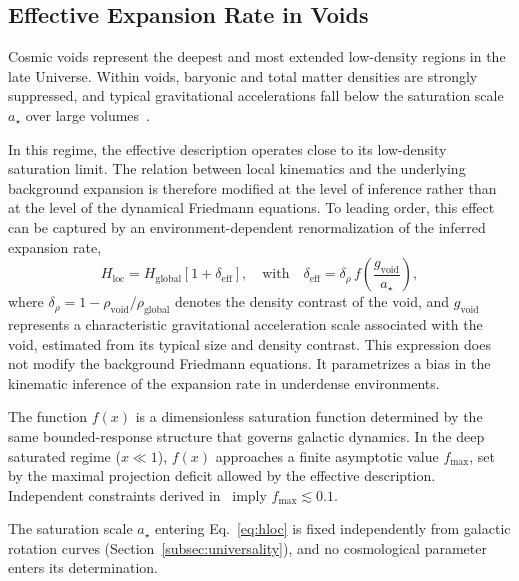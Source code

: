 \subsection{Effective Expansion Rate in Voids}
  \label{subsec:void_effect}

  Cosmic voids represent the deepest and most extended low-density regions in the late Universe.
  Within voids, baryonic and total matter densities are strongly suppressed,
  and typical gravitational accelerations fall below the saturation scale $a_\star$
  over large volumes~\cite{Keenan2013KBC}.

  In this regime, the effective description operates close to its
  low-density saturation limit.
  The relation between local kinematics and the underlying background expansion
  is therefore modified at the level of inference rather than at the level of
  the dynamical Friedmann equations.
  To leading order, this effect can be captured by an environment-dependent
  renormalization of the inferred expansion rate,
  \begin{equation}
    H_{\mathrm{loc}}
    =
    H_{\mathrm{global}}
    \left[
      1
      +
      \delta_{\mathrm{eff}}
    \right],
    \quad \text{with} \quad
    \delta_{\mathrm{eff}}
    =
    \delta_\rho \,
    f\!\left(
         \frac{g_{\mathrm{void}}}{a_\star}
    \right),
    \label{eq:hloc}
  \end{equation}
  where
  $\delta_\rho = 1 - \rho_{\mathrm{void}}/\rho_{\mathrm{global}}$
  denotes the density contrast of the void, and $g_{\mathrm{void}}$ represents a characteristic gravitational
  acceleration scale associated with the void, estimated from its typical size and density contrast.
  This expression does not modify the background Friedmann equations.
  It parametrizes a bias in the kinematic inference of the expansion rate in underdense environments.

  The function $f(x)$ is a dimensionless saturation function
  determined by the same bounded-response structure that governs
  galactic dynamics.
  In the deep saturated regime ($x \ll 1$),
  $f(x)$ approaches a finite asymptotic value $f_{\max}$,
  set by the maximal projection deficit allowed by the effective description.
  Independent constraints derived in~\cite{Beau2026c}
  imply $f_{\max} \lesssim 0.1$.

  The saturation scale $a_\star$ entering Eq.~\eqref{eq:hloc}
  is fixed independently from galactic rotation curves
  (Section~\ref{subsec:universality}),
  and no cosmological parameter enters its determination.

